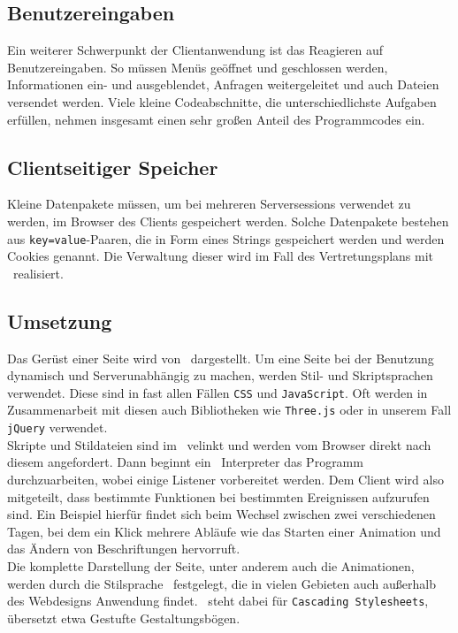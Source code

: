 \subsection{Benutzereingaben}
Ein weiterer Schwerpunkt der Clientanwendung ist das Reagieren auf Benutzereingaben. So müssen Menüs geöffnet und geschlossen werden, Informationen ein- und ausgeblendet, Anfragen weitergeleitet und auch Dateien versendet werden. Viele kleine Codeabschnitte, die unterschiedlichste Aufgaben erfüllen, nehmen insgesamt einen sehr großen Anteil des Programmcodes ein.

\subsection{Clientseitiger Speicher}
Kleine Datenpakete müssen, um bei mehreren Serversessions verwendet zu werden, im Browser des Clients gespeichert werden. Solche Datenpakete bestehen aus \texttt{key=value}-Paaren, die in Form eines Strings gespeichert werden und werden Cookies genannt. Die Verwaltung dieser wird im Fall des Vertretungsplans mit \JavaScript\ realisiert.

\subsection{Umsetzung}
Das Gerüst einer Seite wird von \HTML\ dargestellt. Um eine Seite bei der Benutzung dynamisch und Serverunabhängig zu machen, werden Stil- und Skriptsprachen verwendet. Diese sind in fast allen Fällen \texttt{CSS} und \texttt{JavaScript}. Oft werden in Zusammenarbeit mit diesen auch Bibliotheken wie \texttt{Three.js} oder in unserem Fall \texttt{jQuery} verwendet.\\
Skripte und Stildateien sind im \HTML\ velinkt und werden vom Browser direkt nach diesem angefordert. Dann beginnt ein \JavaScript\ Interpreter das Programm durchzuarbeiten, wobei einige Listener vorbereitet werden. Dem Client wird also mitgeteilt, dass bestimmte Funktionen bei bestimmten Ereignissen aufzurufen sind. Ein Beispiel hierfür findet sich beim Wechsel zwischen zwei verschiedenen Tagen, bei dem ein Klick mehrere Abläufe wie das Starten einer Animation und das Ändern von Beschriftungen hervorruft.\\
Die komplette Darstellung der Seite, unter anderem auch die Animationen, werden durch die Stilsprache \CSS\ festgelegt, die in vielen Gebieten auch außerhalb des Webdesigns Anwendung findet. \CSS\ steht dabei für \texttt{Cascading Stylesheets}, übersetzt etwa \glqq Gestufte Gestaltungsbögen\grqq.